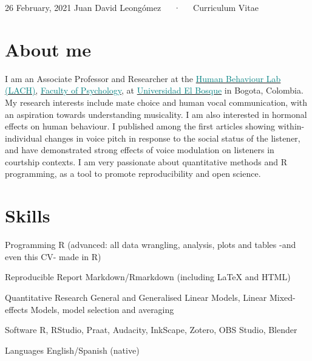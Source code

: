 \documentclass[11pt, a4paper]{awesome-cv}
\begin{document}
\makecvheader

\makecvfooter
  {26 February, 2021}
    {Juan David Leongómez~~~·~~~Curriculum Vitae}
  {\thepage}





\hypertarget{about-me}{%
\section{About me}\label{about-me}}

I am an Associate Professor and Researcher at the
\href{https://sites.google.com/unbosque.edu.co/lach-es}{\textcolor{teal}{Human Behaviour Lab (LACH)}},
\href{https://www.uelbosque.edu.co/psicologia}{\textcolor{teal}{Faculty of Psychology}},
at
\href{https://www.uelbosque.edu.co/}{\textcolor{teal}{Universidad El Bosque}}
in Bogota, Colombia. My research interests include mate choice and human
vocal communication, with an aspiration towards understanding
musicality. I am also interested in hormonal effects on human behaviour.
I published among the first articles showing within-individual changes
in voice pitch in response to the social status of the listener, and
have demonstrated strong effects of voice modulation on listeners in
courtship contexts. I am very passionate about quantitative methods and
R programming, as a tool to promote reproducibility and open science.

\hypertarget{skills}{%
\section{Skills}\label{skills}}

\begin{cvskills}
  \cvskill
    {Programming}
    {R (advanced: all data wrangling, analysis, plots and tables -and even this CV- made in R)}

  \cvskill
    {Reproducible Report}
    {Markdown/Rmarkdown (including {\selectfont\LaTeX} and HTML)}

  \cvskill
    {Quantitative Research}
    {General and Generalised Linear Models, Linear Mixed-effects Models, model selection and averaging}

  \cvskill
    {Software}
    {R, RStudio, Praat, Audacity, InkScape, Zotero, OBS Studio, Blender}

  \cvskill
    {Languages}
    {English/Spanish (native)}
\end{cvskills}
\end{document}
